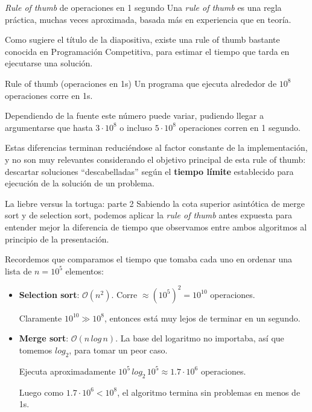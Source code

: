 \documentclass{beamer}
\begin{document}
    \begin{frame}{\textit{Rule of thumb} de operaciones en 1 segundo}
        Una \textit{rule of thumb} es una regla práctica, muchas veces aproximada, basada más en experiencia que en teoría.\vspace{8pt} \pause

        Como sugiere el título de la diapositiva, existe una rule of thumb bastante conocida en Programación Competitiva, para estimar el tiempo que tarda en ejecutarse una solución. \pause

        \begin{block}{Rule of thumb (operaciones en 1s)}
            Un programa que ejecuta alrededor de $10^8$ operaciones corre en 1s.
        \end{block} \pause

        Dependiendo de la fuente este número puede variar, pudiendo llegar a argumentarse que hasta $3 \cdot 10^8$ o incluso $5 \cdot 10^8$ operaciones corren en 1 segundo. \pause 

    Estas diferencias terminan reduciéndose al factor constante de la implementación, y no son muy relevantes considerando el objetivo principal de esta rule of thumb: \pause descartar soluciones ``descabelladas'' según el \textbf{tiempo límite} establecido para ejecución de la solución de un problema.
    \end{frame}

    \begin{frame}{La liebre versus la tortuga: parte 2}
        Sabiendo la cota superior asintótica de merge sort y de selection sort, podemos aplicar la \textit{rule of thumb} antes expuesta para entender mejor la diferencia de tiempo que observamos entre ambos algoritmos al principio de la presentación. \pause

        Recordemos que comparamos el tiempo que tomaba cada uno en ordenar una lista de $n = 10^5$ elementos: \pause

        \begin{itemize}
            \item \textbf{Selection sort}: \pause $\mathcal{O}(n^2)$. \pause Corre $\approx (10^5)^2 = 10^{10}$ operaciones. \pause 

            Claramente $10^{10} \gg 10^8$, entonces está muy lejos de terminar en un segundo. \pause 

            \item \textbf{Merge sort}: \pause $\mathcal{O}(n \, log \, n)$. \pause La base del logaritmo no importaba, así que tomemos $log_2$, para tomar un peor caso. \pause

            Ejecuta aproximadamente $10^5 \, log_2 \, 10^5 \approx 1.7 \cdot 10^6$ operaciones. \pause 

            Luego como $1.7 \cdot 10^6 < 10^8$, el algoritmo termina sin problemas en menos de 1s.
        \end{itemize}
    \end{frame}
\end{document}
